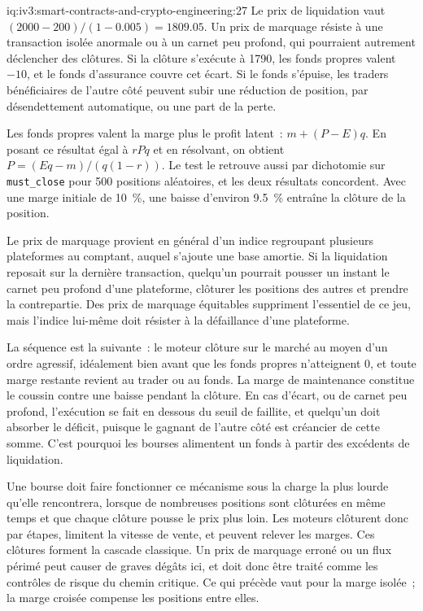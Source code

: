 \begin{solution}{iq:iv3:smart-contracts-and-crypto-engineering:27}
Le prix de liquidation vaut $(2000 - 200) / (1 - 0.005) = 1809.05$. Un prix de marquage résiste à une transaction isolée anormale ou à un carnet peu profond, qui pourraient autrement déclencher des clôtures. Si la clôture s'exécute à 1790, les fonds propres valent $-10$, et le fonds d'assurance couvre cet écart. Si le fonds s'épuise, les traders bénéficiaires de l'autre côté peuvent subir une réduction de position, par désendettement automatique, ou une part de la perte.
\enlargethispage{-4\baselineskip}%
\label{lst:iv3:cr:liquidation}

Les fonds propres valent la marge plus le profit latent~: $m + (P - E) q$. En posant ce résultat égal à $r P q$ et en résolvant, on obtient $P = (E q - m) / (q (1 - r))$. Le test le retrouve aussi par dichotomie sur \texttt{must\_close} pour 500 positions aléatoires, et les deux résultats concordent. Avec une marge initiale de 10~\%, une baisse d'environ 9.5~\% entraîne la clôture de la position.

Le prix de marquage provient en général d'un indice regroupant plusieurs plateformes au comptant, auquel s'ajoute une base amortie. Si la liquidation reposait sur la dernière transaction, quelqu'un pourrait pousser un instant le carnet peu profond d'une plateforme, clôturer les positions des autres et prendre la contrepartie. Des prix de marquage équitables suppriment l'essentiel de ce jeu, mais l'indice lui-même doit résister à la défaillance d'une plateforme.

La séquence est la suivante~: le moteur clôture sur le marché au moyen d'un ordre agressif, idéalement bien avant que les fonds propres n'atteignent 0, et toute marge restante revient au trader ou au fonds. La marge de maintenance constitue le coussin contre une baisse pendant la clôture. En cas d'écart, ou de carnet peu profond, l'exécution se fait en dessous du seuil de faillite, et quelqu'un doit absorber le déficit, puisque le gagnant de l'autre côté est créancier de cette somme. C'est pourquoi les bourses alimentent un fonds à partir des excédents de liquidation.

Une bourse doit faire fonctionner ce mécanisme sous la charge la plus lourde qu'elle rencontrera, lorsque de nombreuses positions sont clôturées en même temps et que chaque clôture pousse le prix plus loin. Les moteurs clôturent donc par étapes, limitent la vitesse de vente, et peuvent relever les marges. Ces clôtures forment la cascade classique. Un prix de marquage erroné ou un flux périmé peut causer de graves dégâts ici, et doit donc être traité comme les contrôles de risque du chemin critique. Ce qui précède vaut pour la marge isolée~; la marge croisée compense les positions entre elles.

\end{solution}

